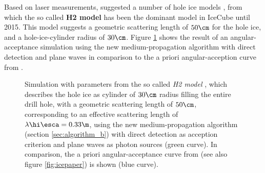 Based on laser measurements,  suggested a number of hole ice models \cite{holeicestudieswithyag}, from which the so called \textbf{H2 model} has been the dominant model in IceCube until 2015. This model suggests a geometric scattering length of $50\cm$ for the hole ice, and a hole-ice-cylinder radius of $30\cm$. Figure \ref{fig:xaeg2Mee} shows the result of an angular-acceptance simulation using the new medium-propagation algorithm with direct detection and plane waves in comparison to the a priori angular-acception curve from \cite{icepaper}.

\begin{figure}[htbp]
  \caption{Simulation with parameters from the so called \textit{H2 model} \cite{holeicestudieswithyag}, which describes the hole ice as cylinder of $30\cm$ radius filling the entire drill hole, with a geometric scattering length of $50\cm$, corresponding to an effective scattering length of $\lambda\hi\esca = 0.33\m$, using the new medium-propagation algorithm (section \ref{sec:algorithm_b}) with direct detection as acception criterion and plane waves as photon sources (green curve). In comparison, the a priori angular-acceptance curve from \cite{icepaper} (see also figure \ref{fig:icepaper}) is shown (blue curve).}
  \label{fig:xaeg2Mee}
\end{figure}

%
%
%
%
%


